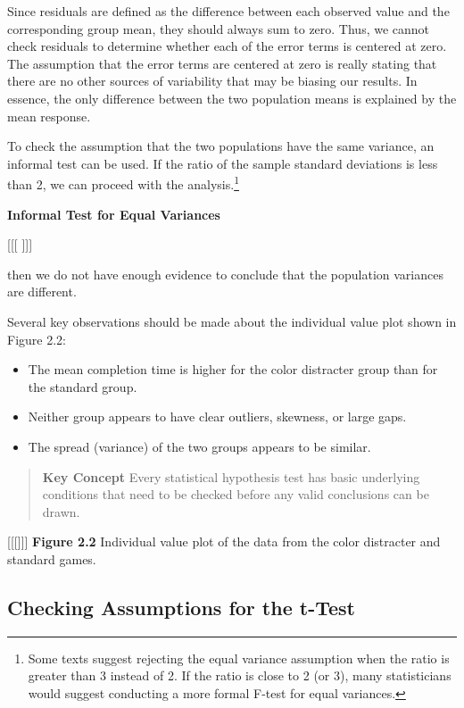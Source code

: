 \documentclass[
]{report}
\providecommand{\tightlist}{%
  \setlength{\itemsep}{0pt}\setlength{\parskip}{0pt}}
\theoremstyle{definition}
\theoremstyle{definition}
\theoremstyle{definition}
\theoremstyle{definition}
\theoremstyle{remark}
\begin{document}
Since residuals are defined as the difference between each observed value and the corresponding group mean, they should always sum to zero. Thus, we cannot check residuals to determine whether each of the error
terms is centered at zero. The assumption that the error terms are centered at zero is really stating that there are no other sources of variability that may be biasing our results. In essence, the only difference between the two population means is explained by the mean response.

To check the assumption that the two populations have the same variance, an informal test can be used. If the ratio of the sample standard deviations is less than 2, we can proceed with the analysis.\footnote{Some texts suggest rejecting the equal variance assumption when the ratio is greater than 3 instead of 2. If the ratio is close to 2 (or 3), many statisticians would suggest conducting a more formal F-test for equal variances.}

\textbf{Informal Test for Equal Variances}

{[}{[}{[} {]}{]}{]}

then we do not have enough evidence to conclude that the population variances are different.

Several key observations should be made about the individual value plot shown in Figure 2.2:

\begin{itemize}
\tightlist
\item
  The mean completion time is higher for the color distracter group than for the standard group.
\item
  Neither group appears to have clear outliers, skewness, or large gaps.
\item
  The spread (variance) of the two groups appears to be similar.
\end{itemize}

\begin{quote}
\textbf{Key Concept}
Every statistical hypothesis test has basic underlying conditions that need to be checked before any valid conclusions can be drawn.
\end{quote}

{[}{[}{[}{]}{]}{]}
\textbf{Figure 2.2} Individual value plot of the data from the color distracter and standard games.

\hypertarget{checking-assumptions-for-the-t-test}{%
\subsection*{Checking Assumptions for the t-Test}\label{checking-assumptions-for-the-t-test}}
\end{document}
